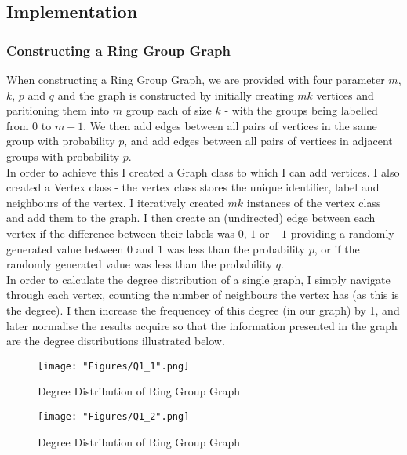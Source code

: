 \documentclass[12pt, a4paper]{article}
\begin{document}
\subsection*{Implementation}
\subsubsection*{Constructing a Ring Group Graph}
When constructing a Ring Group Graph, we are provided with four parameter $m$, $k$, $p$ and $q$ and the graph is constructed by initially creating $mk$ vertices and paritioning them into $m$ group each of size $k$ - with the groups being labelled from $0$ to $m-1$. We then add edges between all pairs of vertices in the same group with probability $p$, and add edges between all pairs of vertices in adjacent groups with probability $p$.\\
In order to achieve this I created a Graph class to which I can add vertices. I also created a Vertex class - the vertex class stores the unique identifier, label and neighbours of the vertex. I iteratively created $mk$ instances of the vertex class and add them to the graph. I then create an (undirected) edge between each vertex if the difference between their labels was $0$, $1$ or $-1$ providing a randomly generated value between 0 and 1 was less than the probability $p$, or if the randomly generated value was less than the probability $q$.\\
In order to calculate the degree distribution of a single graph, I simply navigate through each vertex, counting the number of neighbours the vertex has (as this is the degree). I then increase the frequencey of this degree (in our graph) by 1, and later normalise the results acquire so that the information presented in the graph are the degree distributions illustrated below.
\begin{figure}[!htb]
   \begin{minipage}{0.49\textwidth}
     \centering
     \texttt{[image: "Figures/Q1\_1".png]}
     \caption{Degree Distribution of Ring Group Graph}
     \label{Fig:deg_dist_rgg1}
   \end{minipage}\hfill
   \begin{minipage}{0.49\textwidth}
     \centering
     \texttt{[image: "Figures/Q1\_2".png]}
     \caption{Degree Distribution of Ring Group Graph}
     \label{Fig:deg_dist_rgg2}
   \end{minipage}
  
\end{figure}
\end{document}
